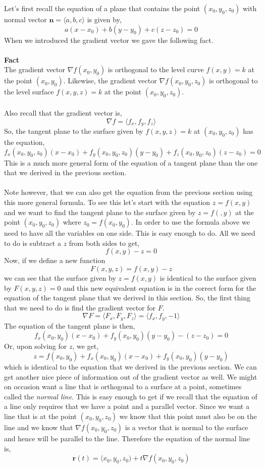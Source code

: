 \documentclass[10pt,reqno]{book}
\theoremstyle{definition}
\renewcommand{\vec}[1]{\mathbf{#1}}
\begin{document}
	Let's first recall the equation of a plane that contains the point $ (x_0,y_0,z_0) $ with normal vector $ \vec{n} = \langle a,b,c \rangle $ is given by,
	\[ a(x-x_0) + b(y-y_0) + c(z-z_0) = 0 \]
	When we introduced the gradient vector we gave the following fact.\\ \\
	\textbf{Fact}\\
	The gradient vector $ \nabla f(x_0,y_0) $ is orthogonal to the level curve $ f(x,y) = k $ at the point $ (x_0,y_0) $. Likewise, the gradient vector $ \nabla f(x_0,y_0,z_0) $ is orthogonal to the level surface $ f(x,y,z) = k $ at the point $ (x_0,y_0,z_0) $.\\ \\
	Also recall that the gradient vector is,
	\[ \nabla f = \langle f_x,f_y,f_z \rangle \]
	So, the tangent plane to the surface given by $ f(x,y,z) = k $ at $ (x_0,y_0,z_0) $ has the equation,
	\[ f_x(x_0,y_0,z_0)(x-x_0) + f_y(x_0,y_0,z_0)(y-y_0) + f_z(x_0,y_0,z_0)(z-z_0) = 0 \]
	This is a much more general form of the equation of a tangent plane than the one that we derived in the previous section.\\ \\
	Note however, that we can also get the equation from the previous section using this more general formula. To see this let's start with the equation $ z = f(x,y) $ and we want to find the tangent plane to the surface given by $ z = f(,y) $ at the point $ (x_0,y_0,z_0) $ where $ z_0 = f(x_0,y_0) $. In order to use the formula above we need to have all the variables on one side. This is easy enough to do. All we need to do is subtract a $ z $ from both sides to get,
	\[ f(x,y) - z = 0 \]
	Now, if we define a new function 
	\[ F(x,y,z) = f(x,y) - z \]
	we can see that the surface given by $ z = f(x,y) $ is identical to the surface given by $ F(x,y,z) = 0 $ and this new equivalent equation is in the correct form for the equation of the tangent plane that we derived in this section.
	So, the first thing that we need to do is find the gradient vector for $ F $.
	\[ \nabla F = \langle F_x,F_y,F_z \rangle = \langle f_x,f_y,-1 \rangle \]
	The equation of the tangent plane is then,
	\[ f_x(x_0,y_0)(x-x_0) + f_y(x_0,y_0)(y-y_0) - (z-z_0) = 0 \]
	Or, upon solving for $ z $, we get,
	\[ z = f(x_0,y_0) + f_x(x_0,y_0)(x-x_0) + f_y(x_0,y_0)(y-y_0) \]
	which is identical to the equation that we derived in the previous section. We can get another nice piece of information out of the gradient vector as well. We might on occasion want a line that is orthogonal to a surface at a point, sometimes called the \textit{normal line}. This is easy enough to get if we recall that the equation of a line only requires that we have a point and a parallel vector. Since we want a line that is at the point $ (x_0,y_0,z_0) $ we know that this point must also be on the line and we know that $ \nabla f(x_0,y_0,z_0) $ is a vector that is normal to the surface and hence will be parallel to the line.  Therefore the equation of the normal line is,
	\[ \vec{r}(t) = \langle x_0,y_0,z_0) + t\nabla f(x_0,y_0,z_0) \]
	
\end{document}
